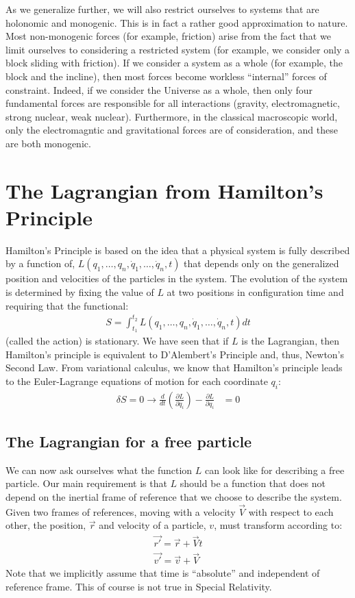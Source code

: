 As we generalize further, we will also restrict ourselves to systems that are holonomic and monogenic. This is in fact a rather good approximation to nature. Most non-monogenic forces (for example, friction) arise from the fact that we limit ourselves to considering a restricted system (for example, we consider only a block sliding with friction). If we consider a system as a whole (for example, the block and the incline), then most forces become workless ``internal'' forces of constraint. Indeed, if we consider the Universe as a whole, then only four fundamental forces are responsible for all interactions (gravity, electromagnetic, strong nuclear, weak nuclear). Furthermore, in the classical macroscopic world, only the electromagntic and gravitational forces are of consideration, and these are both monogenic.

\section{The Lagrangian from Hamilton's Principle}
Hamilton's Principle is based on the idea that a physical system is fully described by a function of, $L(q_1,\dots ,q_n,\dot{q}_1,\dots ,\dot{q}_n,t)$ that depends only on the generalized position and velocities of the particles in the system. The evolution of the system is determined by fixing the value of $L$ at two positions in configuration time and requiring that the functional:
\begin{align}
S=\int_{t_1}^{t_2} L(q_1,\dots ,q_n,\dot{q}_1,\dots ,\dot{q}_n,t) dt
\end{align}
(called the action) is stationary. We have seen that if $L$ is the Lagrangian, then Hamilton's principle is equivalent to D'Alembert's Principle and, thus, Newton's Second Law. From variational calculus, we know that Hamilton's principle leads to the Euler-Lagrange equations of motion for each coordinate $q_i$:
\begin{align}
\delta S=0\to\frac{d}{dt}\left(\frac{\partial L}{\partial \dot{q_i}} \right) - \frac{\partial L}{\partial q_i}&=0
\end{align}
\subsection{The Lagrangian for a free particle}
We can now ask ourselves what the function $L$ can look like for describing a free particle. Our main requirement is that $L$ should be a function that does not depend on the inertial frame of reference that we choose to describe the system. Given two frames of references, moving with a velocity $\vec{V}$ with respect to each other, the position, $\vec{r}$ and velocity of a particle, $v$, must transform according to:
\begin{align}
\vec{r'}=\vec{r}+\vec{V}t\nonumber\\
\vec{v'}=\vec{v}+\vec{V}
\end{align}
Note that we implicitly assume that time is ``absolute'' and independent of reference frame. This of course is not true in Special Relativity.

